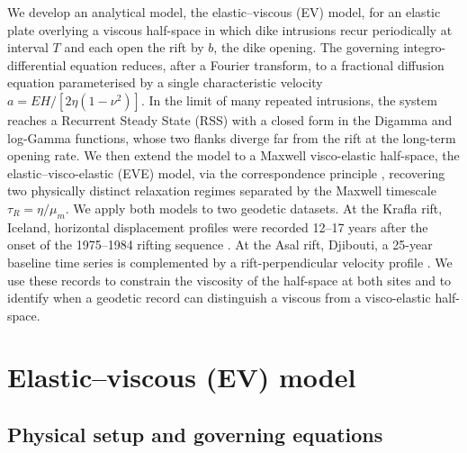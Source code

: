 \documentclass[extra]{gji}
\begin{document}
We develop an analytical model, the elastic--viscous (EV) model, for an
elastic plate overlying a viscous half-space \citep{hetland2006thesis} in
which dike intrusions recur periodically at
interval $T$ and each open the rift by $b$, the dike opening. The governing
integro-differential equation reduces, after a Fourier transform, to a
fractional diffusion equation \citep{metzler2000random,samko1993integration} parameterised by a single characteristic velocity
$a = EH/[2\eta(1-\nu^2)]$. In the limit of many repeated intrusions, the
system reaches a Recurrent Steady State (RSS) with a closed form in the
Digamma and log-Gamma functions, whose two flanks diverge far from the
rift at the long-term opening rate. We then extend the model to a
Maxwell visco-elastic half-space, the elastic--visco-elastic (EVE) model,
via the correspondence principle \citep{hetland2005postseismic,barbot2010unified}, recovering two physically distinct relaxation regimes separated by
the Maxwell timescale $\tau_R = \eta/\mu_m$. We apply both models to two
geodetic datasets. At the Krafla rift, Iceland, horizontal displacement
profiles were recorded 12--17 years after the onset of the 1975--1984
rifting sequence \citep{foulger1992post,hofton1996post}. At the Asal
rift, Djibouti, a 25-year baseline time series is complemented by a
rift-perpendicular velocity profile \citep{vigny2007twenty}. We use these records to
constrain the viscosity of the half-space at both sites and to identify when
a geodetic record can distinguish a viscous from a visco-elastic
half-space.

\section{Elastic--viscous (EV) model}
\label{sec:model}

\subsection{Physical setup and governing equations}
\label{sec:setup}
\end{document}
